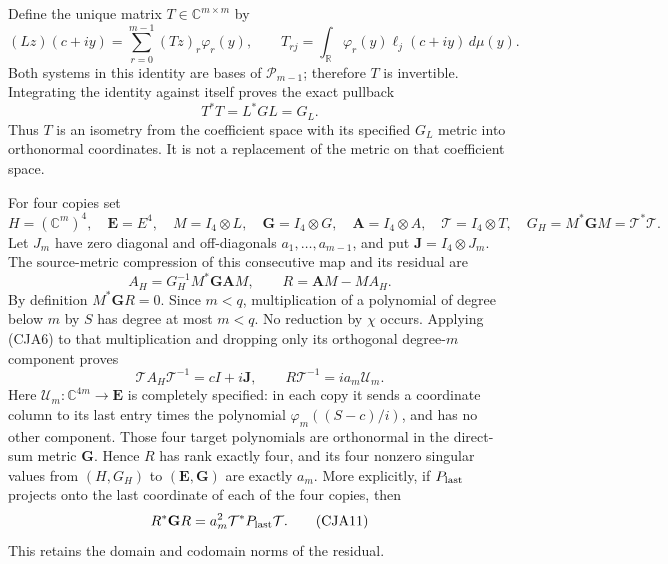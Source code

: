 Define the unique matrix \(T\in\mathbb C^{m\times m}\) by
\begin{equation}
 (Lz)(c+iy)=\sum_{r=0}^{m-1}(Tz)_r\varphi_r(y),\qquad
 T_{rj}=\int_{\mathbb R}\varphi_r(y)\ell_j(c+iy)\,d\mu(y).
 \tag{CJA7}
\end{equation}
Both systems in this identity are bases of \(\mathcal P_{m-1}\);
therefore \(T\) is invertible.
Integrating the identity against itself proves the exact pullback
\begin{equation}
 T^*T=L^*GL=G_L .
 \tag{CJA8}
\end{equation}
Thus \(T\) is an isometry from the coefficient space with its specified
\(G_L\) metric into orthonormal coordinates.  It is not a replacement
of the metric on that coefficient space.

For four copies set
\[
 H=(\mathbb C^m)^4,\quad
 \mathbf E=E^4,\quad
 M=I_4\otimes L,\quad
 \mathbf G=I_4\otimes G,\quad
 \mathbf A=I_4\otimes A,\quad
 \mathcal T=I_4\otimes T,\quad
 G_H=M^*\mathbf GM=\mathcal T^*\mathcal T.
\]
Let \(J_m\) have zero diagonal and off-diagonals
\(a_1,\ldots,a_{m-1}\), and put \(\mathbf J=I_4\otimes J_m\).
The source-metric compression of this consecutive map and its residual are
\begin{equation}
 A_H=G_H^{-1}M^*\mathbf G\mathbf AM,\qquad
 R=\mathbf AM-MA_H .
 \tag{CJA9}
\end{equation}
By definition \(M^*\mathbf GR=0\).
Since \(m<q\), multiplication of a polynomial of degree below \(m\)
by \(S\) has degree at most \(m<q\).  No reduction by \(\chi\)
occurs.  Applying (CJA6) to that multiplication and dropping only its
orthogonal degree-\(m\) component proves
\begin{equation}
 \boxed{\mathcal TA_H\mathcal T^{-1}=cI+i\mathbf J,\qquad
 R\mathcal T^{-1}=i a_m\mathcal U_m.}
 \tag{CJA10}
\end{equation}
Here \(\mathcal U_m:\mathbb C^{4m}\to\mathbf E\) is completely specified:
in each copy it sends a coordinate column to its last entry times the
polynomial \(\varphi_m((S-c)/i)\), and has no other component.
Those four target polynomials are orthonormal in the direct-sum
metric \(\mathbf G\).  Hence \(R\) has rank exactly four, and its four
nonzero singular values from \((H,G_H)\) to
\((\mathbf E,\mathbf G)\) are exactly \(a_m\).
More explicitly, if \(P_{\rm last}\) projects onto the last coordinate
of each of the four copies, then
\begin{equation}
 R^*\mathbf GR=a_m^2\mathcal T^*P_{\rm last}\mathcal T .
 \tag{CJA11}
\end{equation}
This retains the domain and codomain norms of the residual.

